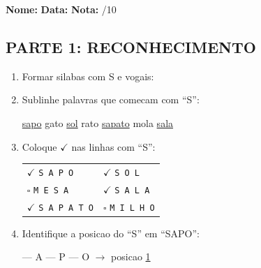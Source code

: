 

\begin{exercicio}
\noindent\textbf{Nome:} \underline{\hspace{3.2cm}} \quad \textbf{Data:} \underline{\hspace{1.6cm}} \quad \textbf{Nota:} \underline{\hspace{0.9cm}}/10

\subsection*{PARTE 1: RECONHECIMENTO}

\begin{enumerate}
  \item Formar silabas com S e vogais:
  \begin{center}
   \quad {} \quad {} \quad {} \quad {}
  \end{center}

  \item Sublinhe palavras que comecam com ``S'':
  \begin{center}
  \uline{sapo} \quad gato \quad \uline{sol} \quad rato \quad \uline{sapato} \quad mola \quad \uline{sala}
  \end{center}

  \item Coloque $\checkmark$ nas linhas com ``S'':
  \begin{center}
  \begin{tabular}{ll}
  $\checkmark$ \texttt{S A P O} & $\checkmark$ \texttt{S O L} \\
  $\square$ \texttt{M E S A} & $\checkmark$ \texttt{S A L A} \\
  $\checkmark$ \texttt{S A P A T O} & $\square$ \texttt{M I L H O}
  \end{tabular}
  \end{center}

  \item Identifique a posicao do ``S'' em ``SAPO'':
  \begin{center}
   --- A --- P --- O $\rightarrow$ posicao \underline{1}
  \end{center}


\end{enumerate}
\end{exercicio}
